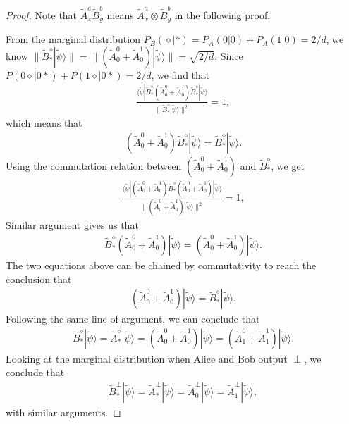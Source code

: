 \documentclass[11pt,letterpaper]{article}
\newcommand{\ket}[1]{|#1\rangle}
\newcommand{\bra}[1]{\langle#1|}
\newcommand{\x}{\otimes}
\newcommand{\1}{\mathbb{1}}
\newcommand{\tA}{\tilde{A}}
\newcommand{\tB}{\tilde{B}}
\newcommand{\tpsi}{\tilde{\psi}}
\newcommand{\pr}[2]{P(#1|#2)}
\newcommand{\pa}[2]{P_A(#1|#2)}
\newcommand{\pb}[2]{P_B(#1|#2)}
\theoremstyle{definition}
\begin{document}
\begin{proof}
Note that $\tA_x^a \tB_y^b$ means $\tA_x^a \x \tB_y^b$ in the following proof.

From the marginal distribution $\pb{\diamond}{\ast} = \pa{0}{0}+\pa{1}{0} = 2/d$,
we know $\| \tB_\ast^\diamond \ket{\tpsi} \| = \| (\tA_0^0+\tA_0^1) \ket{\tpsi}\| = \sqrt{2/d}$.
Since $\pr{0\diamond}{0\ast} + \pr{1\diamond}{0\ast} = 2/d$, we find that 
\begin{align*}
	\frac{\bra{\tpsi}\tB_\ast^\diamond (\tA_0^0+\tA_0^1) \tB_\ast^\diamond\ket{\tpsi}}{ \| \tB_\ast^\diamond \ket{\tpsi} \|^2} = 1,
\end{align*}
which means that 
\begin{align}
	(\tA_0^0+\tA_0^1)\tB_\ast^\diamond \ket{\tpsi} = \tB_\ast^\diamond \ket{\tpsi}.
\end{align}
Using the commutation relation between $(\tA_0^0+\tA_0^1)$ and $\tB_\ast^\diamond$, we get
\begin{align*}
	\frac{\bra{\tpsi} (\tA_0^0+\tA_0^1) \tB_\ast^\diamond(\tA_0^0+\tA_0^1)\ket{\tpsi}}{ \| (\tA_0^0+\tA_0^1) \ket{\tpsi} \|^2} = 1,
\end{align*}
Similar argument gives us that 
\begin{align}
	\tB_\ast^\diamond (\tA_0^0+\tA_0^1) \ket{\tpsi} = (\tA_0^0+\tA_0^1)\ket{\tpsi}.
\end{align}
The two equations above can be chained by commutativity to reach the conclusion that 
\begin{align}
	(\tA_0^0+\tA_0^1)\ket{\tpsi} = \tB_\ast^\diamond \ket{\tpsi}.
\end{align}
Following the same line of argument, we can conclude that
\begin{align}
	\tB_\ast^\diamond \ket{\tpsi} = \tA_\ast^\diamond \ket{\tpsi} = (\tA_0^0+\tA_0^1)\ket{\tpsi} = (\tA_1^0+\tA_1^1)\ket{\tpsi}.
\end{align}
Looking at the marginal distribution when Alice and Bob output $\perp$, we conclude that 
\begin{align}
	\tB_\ast^\perp \ket{\tpsi} = \tA_\ast^\perp \ket{\tpsi} = \tA_0^\perp \ket{\tpsi} = \tA_1^\perp \ket{\tpsi},
\end{align}
with similar arguments.


\end{proof}
\end{document}
